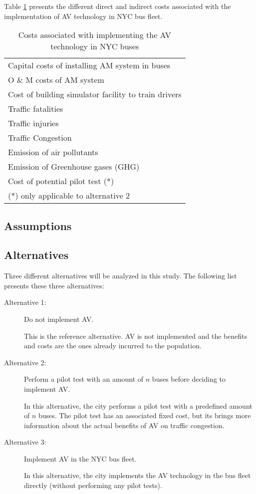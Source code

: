 \documentclass[11pt, letterpaper]{article}
\begin{document}
Table \ref{tab:bca.costs} presents the different direct and indirect
costs associated with the implementation of AV technology in NYC bus
fleet.

\begin{table}[h]
\caption{Costs associated with implementing the AV technology in NYC buses}
\begin{center}
\begin{tabular}{l}
\hline\hline
Capital costs of installing AM system in buses\\
O \& M costs of AM system \\
Cost of building simulator facility to train drivers \\
Traffic fatalities \\
Traffic injuries \\
Traffic Congestion \\
Emission of air pollutants \\
Emission of Greenhouse gases (GHG) \\
Cost of potential pilot test (*) \\
\hline\hline
{\footnotesize (*) only applicable to alternative 2}
\end{tabular}
\end{center}
\label{tab:bca.costs}
\end{table}%

\subsection{Assumptions}


\subsection{Alternatives}

Three different alternatives will be analyzed in this study. The following list presents these three alternatives:

\begin{description}%
\item[Alternative 1:] Do not implement AV.

This is the reference alternative. AV is not implemented and the benefits and costs are the ones already incurred to the population.

\item[Alternative 2:] Perform a pilot test with an amount of $n$ buses before deciding to implement AV.

In this alternative, the city performs a pilot test with a predefined amount of $n$ buses. The pilot test has an associated fixed cost, but its brings more information about the actual benefits of AV on traffic congestion.

\item[Alternative 3:] Implement AV in the NYC bus fleet.

In this alternative, the city implements the AV technology in the bus fleet directly (without performing any pilot tests).

\end{description}
\end{document}
